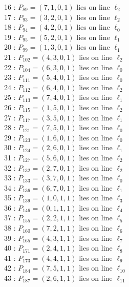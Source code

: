 \documentclass{article}
\begin{document}
{\begin{multicols}{2}
16 : $P_{89}=( 7, 1, 0, 1 )$ lies on line $\ell_{2}$\\
17 : $P_{93}=( 3, 2, 0, 1 )$ lies on line $\ell_{2}$\\
18 : $P_{94}=( 4, 2, 0, 1 )$ lies on line $\ell_{0}$\\
19 : $P_{95}=( 5, 2, 0, 1 )$ lies on line $\ell_{1}$\\
20 : $P_{99}=( 1, 3, 0, 1 )$ lies on line $\ell_{1}$\\
21 : $P_{102}=( 4, 3, 0, 1 )$ lies on line $\ell_{2}$\\
22 : $P_{104}=( 6, 3, 0, 1 )$ lies on line $\ell_{0}$\\
23 : $P_{111}=( 5, 4, 0, 1 )$ lies on line $\ell_{0}$\\
24 : $P_{112}=( 6, 4, 0, 1 )$ lies on line $\ell_{2}$\\
25 : $P_{113}=( 7, 4, 0, 1 )$ lies on line $\ell_{1}$\\
26 : $P_{115}=( 1, 5, 0, 1 )$ lies on line $\ell_{2}$\\
27 : $P_{117}=( 3, 5, 0, 1 )$ lies on line $\ell_{1}$\\
28 : $P_{121}=( 7, 5, 0, 1 )$ lies on line $\ell_{0}$\\
29 : $P_{123}=( 1, 6, 0, 1 )$ lies on line $\ell_{0}$\\
30 : $P_{124}=( 2, 6, 0, 1 )$ lies on line $\ell_{1}$\\
31 : $P_{127}=( 5, 6, 0, 1 )$ lies on line $\ell_{2}$\\
32 : $P_{132}=( 2, 7, 0, 1 )$ lies on line $\ell_{2}$\\
33 : $P_{133}=( 3, 7, 0, 1 )$ lies on line $\ell_{0}$\\
34 : $P_{136}=( 6, 7, 0, 1 )$ lies on line $\ell_{1}$\\
35 : $P_{139}=( 1, 0, 1, 1 )$ lies on line $\ell_{3}$\\
36 : $P_{146}=( 0, 1, 1, 1 )$ lies on line $\ell_{4}$\\
37 : $P_{155}=( 2, 2, 1, 1 )$ lies on line $\ell_{5}$\\
38 : $P_{160}=( 7, 2, 1, 1 )$ lies on line $\ell_{6}$\\
39 : $P_{165}=( 4, 3, 1, 1 )$ lies on line $\ell_{7}$\\
40 : $P_{171}=( 2, 4, 1, 1 )$ lies on line $\ell_{8}$\\
41 : $P_{173}=( 4, 4, 1, 1 )$ lies on line $\ell_{9}$\\
42 : $P_{184}=( 7, 5, 1, 1 )$ lies on line $\ell_{10}$\\
43 : $P_{187}=( 2, 6, 1, 1 )$ lies on line $\ell_{11}$\\

\end{multicols}}
\end{document}
